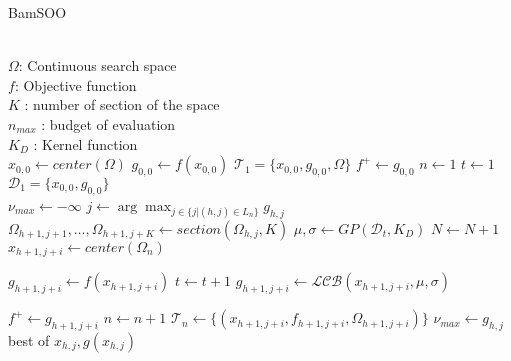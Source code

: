 \begin{algorithm}
\caption{BamSOO}
\label{algo:bamsoo}
\begin{algorithmic}[1]
\Require\\
$\Omega$: Continuous search space \\
$f$: Objective function  \\
$K$ : number of section of the space\\
$n_{max}$ : budget of evaluation \\
$K_D$ : Kernel function\\

\State $x_{0,0} \gets center(\Omega)$ 
\State  $g_{0,0} \gets    f(x_{0,0})$
\State $\mathcal T_1 = \{x_{0,0},g_{0,0},\Omega\}$
\State  $f^+ \gets g_{0,0}$
\State $n \gets 1$ 
\State $t \gets 1$ 
\State $\mathcal D_1 = \{x_{0,0},g_{0,0}\}$ 
\\

    \State $\nu_{max} \gets - \infty$
        \State $j \gets \arg \max_{j \in \{j | (h,j) \in L_n\}} g_{h,j}$
            \State $\Omega_{h+1,j+1},\dots,\Omega_{h+1,j+K} \gets section(\Omega_{h,j},K)$
                \State $\mu,\sigma \gets GP(\mathcal D_t,K_D)$
                \State $N \gets N+1$
                \State $x_{h+1,j+i} \gets center(\Omega_{n})$

                    \State $g_{h+1,j+i} \gets f(x_{h+1,j+i}) $
                    \State $t \gets t+1$
                \Else
                    \State $g_{h+1,j+i} \gets \mathcal{LCB}(x_{h+1,j+i},\mu,\sigma) $
                \EndIf

                    \State $f^+ \gets g_{h+1,j+i} $
                \EndIf         
                \State $n \gets n+1$               
                \State $\mathcal T_n \gets \{(x_{h+1,j+i},f_{h+1,j+i},\Omega_{h+1,j+i})\}$  
            \EndFor  
            \State $\nu_{max} \gets g_{h,j}$
        \EndIf
    \EndFor
\EndWhile\\
\Return best of $x_{h,j},g(x_{h,j})$
\end{algorithmic}
\end{algorithm}